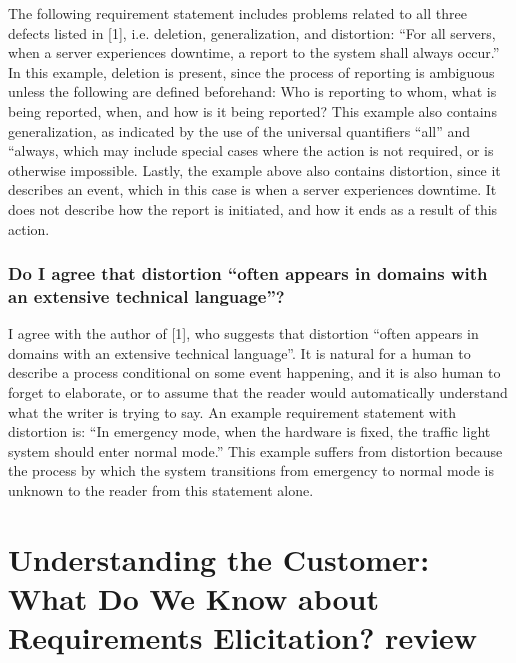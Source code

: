 \documentclass[letterpaper,12pt]{article}
\begin{document}
The following requirement statement includes problems related to all three
defects listed in [1], i.e. deletion, generalization, and distortion: ``For all
servers, when a server experiences downtime, a report to the system shall always
occur.'' In this example, deletion is present, since the process of reporting is
ambiguous unless the following are defined beforehand: Who is reporting to whom,
what is being reported, when, and how is it being reported? This example also
contains generalization, as indicated by the use of the universal quantifiers
``all'' and ``always, which may include special cases where the action is not
required, or is otherwise impossible. Lastly, the example above also contains
distortion, since it describes an event, which in this case is when a server
experiences downtime. It does not describe how the report is initiated, and how
it ends as a result of this action.


\subsubsection{Do I agree that distortion “often appears in domains with an extensive technical language”?}

I agree with the author of [1], who suggests that distortion ``often appears in
domains with an extensive technical language''. It is natural for a human to
describe a process conditional on some event happening, and it is also human to
forget to elaborate, or to assume that the reader would automatically understand
what the writer is trying to say. An example requirement statement with
distortion is: ``In emergency mode, when the hardware is fixed, the traffic
light system should enter normal mode.'' This example suffers from distortion
because the process by which the system transitions from emergency to normal
mode is unknown to the reader from this statement alone.

\section{Understanding the Customer: What Do We Know
  about Requirements Elicitation? review}
\end{document}
